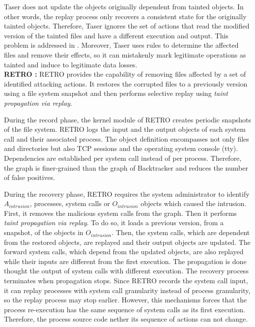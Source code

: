 Taser does not update the objects originally dependent from tainted objects. In other words, the replay process only recovers a consistent state for the originally tainted objects. Therefore, Taser ignores the set of actions that read the modified version of the tainted files and have a different execution and output. This problem is addressed in \cite{Shafique2006}. Moreover, Taser uses rules to determine the affected files and remove their effects, so it can mistakenly mark legitimate operations as tainted and induce to legitimate data losses.\\



\textbf{RETRO \cite{retro}:} RETRO provides the capability of removing files affected by a set of identified attacking actions. It restores the corrupted files to a previously version using a file system snapshot and then performs selective replay using \textit{taint propagation via replay}. 

During the record phase, the kernel module of RETRO creates periodic snapshots of the file system. RETRO logs the input and the output objects of each system call and their associated process. The object definition encompasses not only files and directories but also \ac{TCP} sessions and the operating system console (tty). Dependencies are established per system call instead of per process. Therefore, the graph is finer-grained than the graph of Backtracker \cite{backtracker} and reduces the number of false positives.

During the recovery phase, RETRO requires the system administrator to identify $A_{intrusion}$, processes, system calls or $O_{intrusion}$ objects which caused the intrusion. First, it removes the malicious system calls from the graph. Then it performs \textit{taint propagation via replay}. To do so, it loads a previous version, from a snapshot, of the objects in $O_{intrusion}$. Then, the system calls, which are dependent from the restored objects, are replayed and their output objects are updated. The forward system calls, which depend from the updated objects, are also replayed while their inputs are different from the first execution. The propagation is done thought the output of system calls with different execution. The recovery process terminates when propagation stops. Since RETRO records the system call input, it can replay processes with system call granularity instead of process granularity, so the replay process may stop earlier. However, this mechanisms forces that the process re-execution has the same sequence of system calls as its first execution. Therefore, the process source code nether its sequence of actions can not change. 


